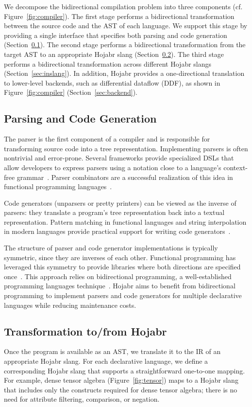 \documentclass[sigconf,nonacm]{acmart}
\begin{document}
We decompose the bidirectional compilation problem into three components (cf. Figure~\ref{fig:compiler}). The first stage performs a bidirectional transformation between the source code and the AST of each language. We support this stage by providing a single interface that specifies both parsing and code generation (Section~\ref{sec:parserunparser}). The second stage performs a bidirectional transformation from the target AST to an appropriate Hojabr slang (Section~\ref{sec:toslang}). The third stage performs a bidirectional transformation across different Hojabr slangs (Section~\ref{sec:inslang}). In addition, Hojabr provides a one-directional translation to lower-level backends, such as differential dataflow (DDF), as shown in Figure~\ref{fig:compiler} (Section~\ref{sec:backend}).

\subsection{Parsing and Code Generation}
\label{sec:parserunparser}
The parser is the first component of a compiler and is responsible for transforming source code into a tree representation. Implementing parsers is often nontrivial and error-prone. Several frameworks provide specialized DSLs that allow developers to express parsers using a notation close to a language’s context-free grammar~\cite{cooper2022engineering}. Parser combinators are a successful realization of this idea in functional programming languages~\cite{hutton1992higher}.

Code generators (unparsers or pretty printers) can be viewed as the inverse of parsers: they translate a program’s tree representation back into a textual representation. Pattern matching in functional languages and string interpolation in modern languages provide practical support for writing code generators~\cite{hughes1995design}.

The structure of parser and code generator implementations is typically symmetric, since they are inverses of each other. Functional programming has leveraged this symmetry to provide libraries where both directions are specified once~\cite{rendel2010invertible}. This approach relies on bidirectional programming, a well-established programming languages technique~\cite{foster2009bidirectional}. Hojabr aims to benefit from bidirectional programming to implement parsers and code generators for multiple declarative languages while reducing maintenance costs.

\subsection{Transformation to/from Hojabr}
\label{sec:toslang}
Once the program is available as an AST, we translate it to the IR of an appropriate Hojabr slang. For each declarative language, we define a corresponding Hojabr slang that supports a straightforward one-to-one mapping. For example, dense tensor algebra (Figure~\ref{fig:tensor}) maps to a Hojabr slang that includes only the constructs required for dense tensor algebra; there is no need for attribute filtering, comparison, or negation.
\end{document}
